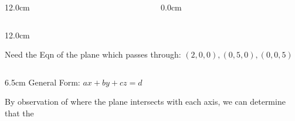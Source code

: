 \begin{frame}
\begin{columns}
\begin{column}{12.0cm}
\vspace{2.2cm}

\end{column}\begin{column}{0.0cm}\end{column}\end{columns}
\end{frame}

\begin{frame}
\scriptsize
\begin{columns}\begin{column}{12.0cm}

	
	\vspace{0.2cm}

Need the Eqn of the plane which passes through: $(2,0,0), (0,5,0), (0,0,5)$	

\vspace{0.2cm}

\begin{columns}
\begin{column}{6.5cm}
General Form: $ax+by+cz=d$

\vspace{0.2cm}

By observation of where the plane intersects with each axis, we can determine that the 
	
%
%

%

	\vspace{0.3cm}
	

\end{column}
\end{columns}
\end{column}
\end{columns}
\end{frame}
